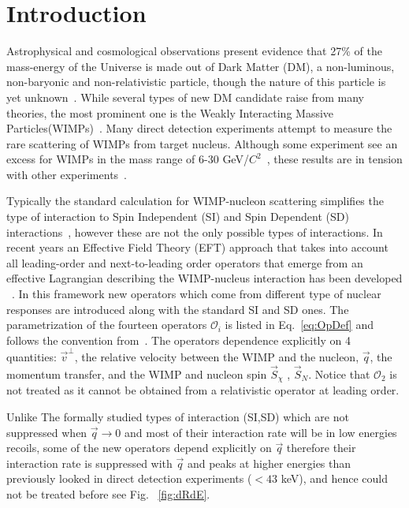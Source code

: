 \section{Introduction}

	Astrophysical and cosmological observations present evidence that 27\% of the mass-energy of the Universe is made out of Dark Matter (DM), a non-luminous, non-baryonic and non-relativistic particle, though the nature of this particle is yet unknown~\cite{Harvey1462}. While several types of new DM candidate raise from many theories, the most prominent one is the Weakly Interacting Massive Particles(WIMPs)~\cite{Bertone:2010zza}. Many  direct detection experiments attempt to measure the rare scattering of WIMPs from target nucleus. Although some experiment see an excess for WIMPs in the mass range of 6-30 GeV/$C^2$~\cite{DAMA,COGENT,CDMSlite,CREST}, these results are in tension with other experiments~\cite{xe100_run_combination,PANDAX,LUXnew}.
	
	 Typically the standard calculation for WIMP-nucleon scattering simplifies the type of interaction to Spin Independent (SI) and Spin Dependent (SD) interactions~\cite{LEWIN}, however these are not the only possible types of interactions. In recent years an Effective Field Theory (EFT) approach that takes into account all leading-order and next-to-leading order operators that emerge from an effective Lagrangian describing the WIMP-nucleus interaction has been developed ~\cite{Fitzpatrick:2012ib,Anand:MathTools,Fitzpatrick:MathTools}. In this framework new operators which come from different type of nuclear responses are introduced along with the standard SI and SD ones. The parametrization of the fourteen operators $\mathcal{O}_i$ is listed in Eq.~\ref{eq:OpDef} and follows the convention from~\cite{Anand:MathTools}. The operators dependence explicitly on 4 quantities: $\vec{v}^{\perp}$, the relative velocity between the WIMP and the nucleon, $\vec{q}$, the momentum transfer, and the WIMP and nucleon spin $\vec{S}_\chi$ , $\vec{S}_N$. Notice that $\mathcal{O}_2$ is not treated as it cannot be obtained from a relativistic operator at leading order.
	 
	    Unlike The formally studied types of interaction (SI,SD) which are not suppressed when $\vec{q} \rightarrow 0$ and most of their interaction rate will be in low energies recoils, some of the new operators depend explicitly on $\vec{q}$ therefore their interaction rate is suppressed with $\vec{q}$ and peaks at higher energies than previously looked in direct detection experiments ($< 43$ keV), and hence could not be treated before see Fig. ~\ref{fig:dRdE}.
	    
